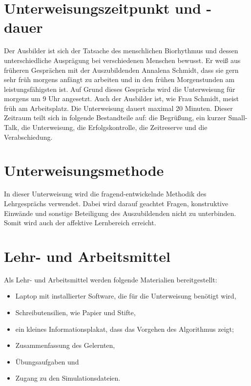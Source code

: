 \section{Unterweisungszeitpunkt und -dauer}
Der Ausbilder ist sich der Tatsache des menschlichen Biorhythmus und dessen unterschiedliche Ausprägung bei verschiedenen Menschen bewusst. Er weiß aus früheren Gesprächen mit der Auszubildenden Annalena Schmidt, dass sie gern sehr früh morgens anfängt zu arbeiten und in den frühen Morgenstunden am leistungsfähigsten ist. Auf Grund dieses Gesprächs wird die Unterweisung für morgens um 9 Uhr angesetzt. Auch der Ausbilder ist, wie Frau Schmidt, meist früh am Arbeitsplatz. Die Unterweisung dauert maximal 20 Minuten. Dieser Zeitraum teilt sich in folgende Bestandteile auf: die Begrüßung, ein kurzer Small-Talk, die Unterweisung, die Erfolgskontrolle, die Zeitreserve und die Verabschiedung.

\section{Unterweisungsmethode}
In dieser Unterweisung wird die fragend-entwickelnde Methodik des Lehrgesprächs verwendet. Dabei wird darauf geachtet Fragen, konstruktive Einwände und sonstige Beteiligung des Auszubildenden nicht zu unterbinden. Somit wird auch der affektive Lernbereich erreicht. 

\section{Lehr- und Arbeitsmittel}
Als Lehr- und Arbeitsmittel werden folgende Materialien bereitgestellt: 
\begin{itemize}
	\item Laptop mit installierter Software, die für die Unterweisung benötigt wird,
	\item Schreibutensilien, wie Papier und Stifte, 
	\item ein kleines Informationsplakat, dass das Vorgehen des Algorithmus zeigt;
	\item Zusammenfassung des Gelernten,
	\item Übungsaufgaben und 
	\item Zugang zu den Simulationsdateien.
\end{itemize}


